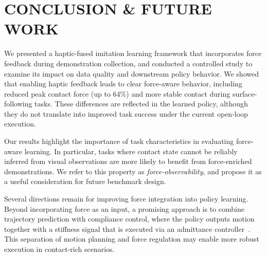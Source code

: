 \documentclass[letterpaper, 10 pt, conference]{ieeeconf}  %
\begin{document}
\label{sec:fut}

\section{CONCLUSION \& FUTURE WORK}

We presented a haptic-fused imitation learning framework that incorporates force feedback during demonstration collection, and conducted a controlled study to examine its impact on data quality and downstream policy behavior. We showed that enabling haptic feedback leads to clear force-aware behavior, including reduced peak contact force (up to 64\%) and more stable contact during surface-following tasks. These differences are reflected in the learned policy, although they do not translate into improved task success under the current open-loop execution.

Our results highlight the importance of task characteristics in evaluating force-aware learning. In particular, tasks where contact state cannot be reliably inferred from visual observations are more likely to benefit from force-enriched demonstrations. We refer to this property as \textit{force-observability}, and propose it as a useful consideration for future benchmark design.

Several directions remain for improving force integration into policy learning. Beyond incorporating force as an input, a promising approach is to combine trajectory prediction with compliance control, where the policy outputs motion together with a stiffness signal that is executed via an admittance controller~\cite{maples1986force, hou2019robust}. This separation of motion planning and force regulation may enable more robust execution in contact-rich scenarios.
\end{document}
